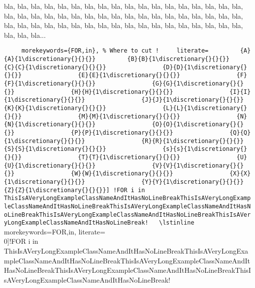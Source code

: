 \documentclass{minimal}
\begin{document}
bla, bla, bla, bla, bla, bla, bla, bla, bla, bla, bla, bla, bla, bla, bla, bla, bla, bla, bla, bla, bla, bla, bla, bla, bla, bla, bla, bla, bla, bla, bla, bla, bla, bla, bla, bla, bla, bla, bla, bla, bla, bla, bla, bla, bla, bla, bla, bla, bla, bla, bla, bla, bla, bla, bla, bla, bla...

\lstinline[
	morekeywords={FOR,in},
	literate=
		{A}{A}{1\discretionary{}{}{}}
		{B}{B}{1\discretionary{}{}{}}
               {C}{C}{1\discretionary{}{}{}}
               {D}{D}{1\discretionary{}{}{}}
               {E}{E}{1\discretionary{}{}{}}
               {F}{F}{1\discretionary{}{}{}}
               {G}{G}{1\discretionary{}{}{}}
               {H}{H}{1\discretionary{}{}{}}
               {I}{I}{1\discretionary{}{}{}}
               {J}{J}{1\discretionary{}{}{}}
               {K}{K}{1\discretionary{}{}{}}
               {L}{L}{1\discretionary{}{}{}}
               {M}{M}{1\discretionary{}{}{}}
               {N}{N}{1\discretionary{}{}{}}
               {O}{O}{1\discretionary{}{}{}}
               {P}{P}{1\discretionary{}{}{}}
               {Q}{Q}{1\discretionary{}{}{}}
               {R}{R}{1\discretionary{}{}{}}
               {S}{S}{1\discretionary{}{}{}}
               {s}{s}{1\discretionary{}{}{}}
               {T}{T}{1\discretionary{}{}{}}
               {U}{U}{1\discretionary{}{}{}}
               {V}{V}{1\discretionary{}{}{}}
               {W}{W}{1\discretionary{}{}{}}
               {X}{X}{1\discretionary{}{}{}}
               {Y}{Y}{1\discretionary{}{}{}}
               {Z}{Z}{1\discretionary{}{}{}}]
!FOR i in ThisIsAVeryLongExampleClassNameAndItHasNoLineBreakThisIsAVeryLongExampleClassNameAndItHasNoLineBreakThisIsAVeryLongExampleClassNameAndItHasNoLineBreakThisIsAVeryLongExampleClassNameAndItHasNoLineBreakThisIsAVeryLongExampleClassNameAndItHasNoLineBreak!


\lstinline[
	morekeywords={FOR,in},
	literate={\\\-}{}{0}]!FOR i in This\-Is\-A\-Very\-Long\-Example\-Class\-Name\-And\-It\-Has\-No\-Line\-Break\-This\-Is\-A\-Very\-Long\-Example\-Class\-Name\-And\-It\-Has\-No\-Line\-Break\-This\-Is\-A\-Very\-Long\-Example\-Class\-Name\-And\-It\-Has\-No\-Line\-Break\-This\-Is\-A\-Very\-Long\-Example\-Class\-Name\-And\-It\-Has\-No\-Line\-Break\-This\-Is\-A\-Very\-Long\-Example\-Class\-Name\-And\-It\-Has\-No\-Line\-Break!
\end{document}
